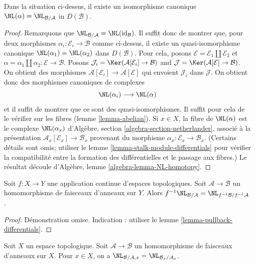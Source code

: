 \begin{lemma}
\label{lemma-NL-up-to-qis}
Dans la situation ci-dessus, il existe un isomorphisme canonique
$\NL(\alpha) = \NL_{\mathcal{B}/\mathcal{A}}$ in $D(\mathcal{B})$.
\end{lemma}

\begin{proof}
Remarquons que
$\NL_{\mathcal{B}/\mathcal{A}} = \NL(\text{id}_\mathcal{B})$. Il suffit
donc de montrer que, pour deux morphismes
$\alpha_i : \mathcal{E}_i \to \mathcal{B}$ comme ci-dessus, il existe un
quasi-isomorphisme canonique
$\NL(\alpha_1) = \NL(\alpha_2)$ dans $D(\mathcal{B})$. Pour cela, posons
$\mathcal{E} = \mathcal{E}_1 \amalg \mathcal{E}_2$ et
$\alpha = \alpha_1 \amalg \alpha_2 : \mathcal{E} \to \mathcal{B}$.
Posons
$\mathcal{J}_i = \Ker(\mathcal{A}[\mathcal{E}_i] \to \mathcal{B})$
and
$\mathcal{J} = \Ker(\mathcal{A}[\mathcal{E}] \to \mathcal{B})$.
On obtient des morphismes
$\mathcal{A}[\mathcal{E}_i] \to \mathcal{A}[\mathcal{E}]$ qui envoient
$\mathcal{J}_i$ dans $\mathcal{J}$. On obtient donc des morphismes
canoniques de complexes
$$
\NL(\alpha_i) \longrightarrow \NL(\alpha)
$$
et il suffit de montrer que ce sont des quasi-isomorphismes. Il suffit pour
cela de le vérifier sur les fibres (lemme \ref{lemma-abelian}). Si $x \in X$,
la fibre de $\NL(\alpha)$ est le complexe $\NL(\alpha_x)$ d'Algèbre,
section \ref{algebra-section-netherlander}, associé à la présentation
$\mathcal{A}_x[\mathcal{E}_x] \to \mathcal{B}_x$ provenant du morphisme
$\alpha_x : \mathcal{E}_x \to \mathcal{B}_x$. (Certains détails sont omis;
utiliser le lemme \ref{lemma-stalk-module-differentials} pour vérifier la
compatibilité entre la formation des différentielles et le passage aux
fibres.) Le résultat découle d'Algèbre, lemme
\ref{algebra-lemma-NL-homotopy}.
\end{proof}

\begin{lemma}
\label{lemma-pullback-NL}
Soit $f : X \to Y$ une application continue d'espaces topologiques. Soit
$\mathcal{A} \to \mathcal{B}$ un homomorphisme de faisceaux d'anneaux sur
$Y$. Alors $f^{-1}\NL_{\mathcal{B}/\mathcal{A}} =
\NL_{f^{-1}\mathcal{B}/f^{-1}\mathcal{A}}$.
\end{lemma}

\begin{proof}
Démonstration omise. Indication : utiliser le lemme
\ref{lemma-pullback-differentials}.
\end{proof}

\begin{lemma}
\label{lemma-stalk-NL}
Soit $X$ un espace topologique. Soit $\mathcal{A} \to \mathcal{B}$ un
homomorphisme de faisceaux d'anneaux sur $X$. Pour $x \in X$, on a
$\NL_{\mathcal{B}/\mathcal{A}, x} =
\NL_{\mathcal{B}_x/\mathcal{A}_x}$.
\end{lemma}

